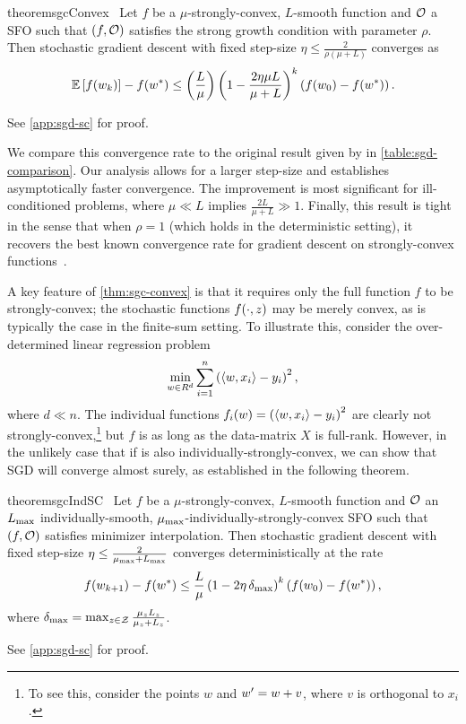 \begin{restatable}{theorem}{sgcConvex}~\label{thm:sgc-convex}
    Let \( f \) be a \( \mu \)-strongly-convex, \( L \)-smooth function and \( \oracle{} \) a SFO such that \( \rbr{f, \oracle{}} \) satisfies the strong growth condition with parameter \( \rho \).
    Then stochastic gradient descent with fixed step-size \( \eta \leq \frac{2}{\rho(\mu + L)} \) converges as 
    \[ \E\sbr{f(\wk)} - f(\wopt) \leq \rbr{\frac{L}{\mu}}\rbr{1 - \frac{2\eta \mu L}{\mu + L}}^k \rbr{f(\w_0) - f(\wopt)}. \] 
\end{restatable}%
\noindent See \autoref{app:sgd-sc} for proof.\hfill \break

We compare this convergence rate to the original result given by \citet[Theorem 5]{vaswani2019fast} in \autoref{table:sgd-comparison}.
Our analysis allows for a larger step-size and establishes asymptotically faster convergence.
The improvement is most significant for ill-conditioned problems, where \( \mu \ll L \) implies \( \frac{2 L}{\mu + L} \gg 1 \). 
Finally, this result is tight in the sense that when \( \rho = 1 \) (which holds in the deterministic setting), it recovers the best known convergence rate for gradient descent on strongly-convex functions~\citep[Theorem 3.12]{bubeck2015convex}.

A key feature of \autoref{thm:sgc-convex} is that it requires only the full function \( f \) to be strongly-convex; the stochastic functions \( f(\cdot, \z) \) may be merely convex, as is typically the case in the finite-sum setting.
To illustrate this, consider the over-determined linear regression problem
\[ \min_{\w \in R^d} \sum_{i=1}^n \rbr{\abr{\w, x_i} - y_i}^2, \]
where \( d \ll n \).
The individual functions \( f_i(\w) = \rbr{\abr{\w, x_i} - y_i}^2 \) are clearly not strongly-convex,\footnote{To see this, consider the points \(w\) and \( \w' = \w + v \), where \( v \) is orthogonal to \( x_i \).} but \( f \) is as long as the data-matrix \( X \) is full-rank. 
However, in the unlikely case that if \oracle{} is also individually-strongly-convex, we can show that SGD will converge almost surely, as established in the following theorem.

\begin{restatable}{theorem}{sgcIndSC}~\label{thm:sgc-ind-sc}
    Let \( f \) be a \( \mu \)-strongly-convex, \( L \)-smooth function and \( \oracle{} \) an \( \Lmax \) individually-smooth, \( \mumax \)-individually-strongly-convex SFO such that \( \rbr{f, \oracle{}} \) satisfies minimizer interpolation. 
    Then stochastic gradient descent with fixed step-size \( \eta \leq \frac{2}{\mumax + \Lmax} \) converges deterministically at the rate 
    \[ f(\wkk) - f(\wopt) \leq \frac{L}{\mu} \rbr{1 - 2 \eta \, \delta_{\text{max}} }^k \rbr{f(\w_0) - f(\wopt)}, \] 
    where \( \delta_{\text{max}} = \max_{\z \in \calZ} \frac{\mu_\z L_\z}{\mu_\z + L_\z} \).
\end{restatable}%
\noindent See \autoref{app:sgd-sc} for proof.\hfill \break

